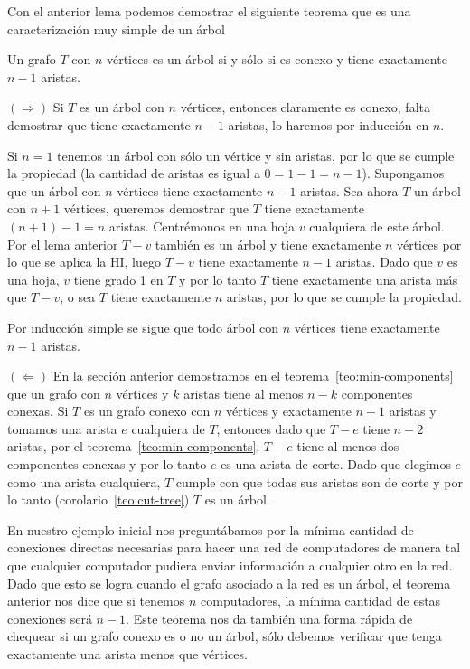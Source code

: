 Con el anterior lema podemos demostrar el siguiente teorema que es una caracterización muy simple de un árbol

\begin{teorema}\label{teo:tree-edges}
Un grafo $T$ con $n$ vértices es un árbol si y sólo si es conexo y tiene exactamente $n-1$ aristas.

\begin{demostracion}
$(\Rightarrow)$ Si $T$ es un árbol con $n$ vértices, entonces claramente es conexo, falta demostrar que tiene exactamente $n-1$ aristas, lo haremos por inducción en $n$.
\begin{inducciondemo}
  \BI Si $n=1$ tenemos un árbol con sólo un vértice y sin aristas, por lo que se cumple la propiedad (la cantidad de aristas es igual a $0 = 1-1 = n-1$).
  \HI Supongamos que un árbol con $n$ vértices tiene exactamente $n-1$ aristas.
  \TI Sea ahora $T$ un árbol con $n+1$ vértices, queremos demostrar que $T$ tiene exactamente $(n+1)-1=n$ aristas.
  Centrémonos en una hoja $v$ cualquiera de este árbol.
  Por el lema anterior $T-v$ también es un árbol y tiene exactamente $n$ vértices por lo que se aplica la HI, luego $T-v$ tiene exactamente $n-1$ aristas.
  Dado que $v$ es una hoja, $v$ tiene grado 1 en $T$ y por lo tanto $T$ tiene exactamente una arista más que $T-v$, o sea $T$ tiene exactamente $n$ aristas, por lo que se cumple la propiedad.
\end{inducciondemo}
Por inducción simple se sigue que todo árbol con $n$ vértices tiene exactamente $n-1$ aristas.

$(\Leftarrow)$ En la sección anterior demostramos  en el teorema~\ref{teo:min-components} que un grafo con $n$ vértices y $k$ aristas tiene al menos $n-k$ componentes conexas.
Si $T$ es un grafo conexo con $n$ vértices y exactamente $n-1$ aristas y tomamos una arista $e$ cualquiera de $T$, entonces dado que $T-e$ tiene $n-2$ aristas, por el teorema~\ref{teo:min-components}, $T-e$ tiene al menos dos componentes conexas y por lo tanto $e$ es una arista de corte.
Dado que elegimos $e$ como una arista cualquiera, $T$ cumple con que todas sus aristas son de corte y por lo tanto (corolario~\ref{teo:cut-tree}) $T$ es un árbol.

\end{demostracion}
\end{teorema}

En nuestro ejemplo inicial nos preguntábamos por la mínima cantidad de conexiones directas necesarias para hacer una red de computadores de manera tal que cualquier computador pudiera enviar información a cualquier otro en la red.
Dado que esto se logra cuando el grafo asociado a la red es un árbol, el teorema anterior nos dice que si tenemos $n$ computadores, la mínima cantidad de estas conexiones será $n-1$.
Este teorema nos da también una forma rápida de chequear si un grafo conexo es o no un árbol, sólo debemos verificar que tenga exactamente una arista menos que vértices.

